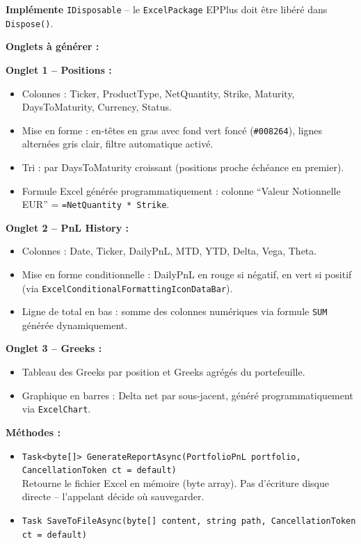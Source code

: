 \documentclass[a4paper,11pt]{article}
\newcommand{\cs}[1]{\texttt{\color{codeinline}#1}}
\begin{document}
\textbf{Implémente} \cs{IDisposable} -- le \cs{ExcelPackage} EPPlus doit
être libéré dans \cs{Dispose()}.

\textbf{Onglets à générer :}

\textbf{Onglet 1 -- Positions :}
\begin{itemize}
  \item Colonnes : Ticker, ProductType, NetQuantity, Strike, Maturity,
        DaysToMaturity, Currency, Status.
  \item Mise en forme : en-têtes en gras avec fond vert foncé (\texttt{\#008264}),
        lignes alternées gris clair, filtre automatique activé.
  \item Tri : par DaysToMaturity croissant (positions proche échéance en premier).
  \item Formule Excel générée programmatiquement : colonne
        ``Valeur Notionnelle EUR'' = \texttt{=NetQuantity * Strike}.
\end{itemize}

\textbf{Onglet 2 -- PnL History :}
\begin{itemize}
  \item Colonnes : Date, Ticker, DailyPnL, MTD, YTD, Delta, Vega, Theta.
  \item Mise en forme conditionnelle : DailyPnL en rouge si négatif, en
        vert si positif (via \cs{ExcelConditionalFormattingIconDataBar}).
  \item Ligne de total en bas : somme des colonnes numériques via formule
        \texttt{SUM} générée dynamiquement.
\end{itemize}

\textbf{Onglet 3 -- Greeks :}
\begin{itemize}
  \item Tableau des Greeks par position et Greeks agrégés du portefeuille.
  \item Graphique en barres : Delta net par sous-jacent, généré
        programmatiquement via \cs{ExcelChart}.
\end{itemize}

\textbf{Méthodes :}
\begin{itemize}
  \item \cs{Task<byte[]> GenerateReportAsync(PortfolioPnL portfolio, CancellationToken ct = default)}\\
        Retourne le fichier Excel en mémoire (byte array). Pas d'écriture
        disque directe -- l'appelant décide où sauvegarder.
  \item \cs{Task SaveToFileAsync(byte[] content, string path, CancellationToken ct = default)}
\end{itemize}
\end{document}
